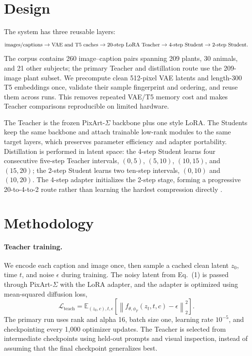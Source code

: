 \documentclass{article}
\begin{document}
\section{Design}

The system has three reusable layers:
\begin{equation}
\small
\text{images/captions}
\rightarrow \text{VAE and T5 caches}
\rightarrow \text{20-step LoRA Teacher}
\rightarrow \text{4-step Student}
\rightarrow \text{2-step Student}.
\end{equation}
The corpus contains 260 image--caption pairs spanning 209 plants, 30 animals, and 21 other subjects; the primary Teacher and distillation route use the 209-image plant subset. We precompute clean 512-pixel VAE latents and length-300 T5 embeddings once, validate their sample fingerprint and ordering, and reuse them across runs. This removes repeated VAE/T5 memory cost and makes Teacher comparisons reproducible on limited hardware.

The Teacher is the frozen PixArt-$\Sigma$ backbone plus one style LoRA. The Students keep the same backbone and attach trainable low-rank modules to the same target layers, which preserves parameter efficiency and adapter portability. Distillation is performed in latent space: the 4-step Student learns four consecutive five-step Teacher intervals, $(0,5)$, $(5,10)$, $(10,15)$, and $(15,20)$; the 2-step Student learns two ten-step intervals, $(0,10)$ and $(10,20)$. The 4-step adapter initializes the 2-step stage, forming a progressive 20-to-4-to-2 route rather than learning the hardest compression directly \cite{salimans2022progressive}.

\section{Methodology}

\paragraph{Teacher training.}
We encode each caption and image once, then sample a cached clean latent $z_0$, time $t$, and noise $\epsilon$ during training. The noisy latent from Eq.~(1) is passed through PixArt-$\Sigma$ with the LoRA adapter, and the adapter is optimized using mean-squared diffusion loss,
\begin{equation}
\mathcal{L}_{\mathrm{teach}}
=\mathbb{E}_{(z_0,c),t,\epsilon}
\left[\left\|f_{\theta,\phi_T}(z_t,t,c)-\epsilon\right\|_2^2\right].
\end{equation}
The primary run uses rank and alpha 16, batch size one, learning rate $10^{-5}$, and checkpointing every 1,000 optimizer updates. The Teacher is selected from intermediate checkpoints using held-out prompts and visual inspection, instead of assuming that the final checkpoint generalizes best.
\end{document}
